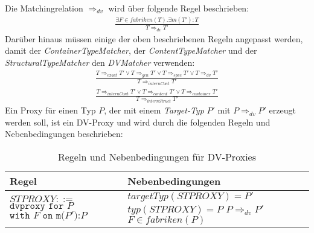 \documentclass[a4paper,12pt]{article}
\begin{document}
\noindent
Die Matchingrelation $\Rightarrow_{dv}$ wird über folgende Regel beschrieben:
\begin{gather*}
\frac{\exists F \in fabriken(T). \exists m(T'):T}{T \Rightarrow_{dv} T'}
\end{gather*}
Darüber hinaus müssen einige der oben beschriebenen Regeln angepasst werden, damit der \emph{ContainerTypeMatcher}, der \emph{ContentTypeMatcher} und der \emph{StructuralTypeMatcher} den \emph{DVMatcher} verwenden:
\begin{gather*}
\frac{T \Rightarrow_{exact} T' \vee T \Rightarrow_{gen} T' \vee
T \Rightarrow_{spec} T' \vee T \Rightarrow_{dv} T'  }{T \Rightarrow_{internCont} T'}
\end{gather*}
\begin{gather*}
\frac{T \Rightarrow_{internCont} T' \vee T \Rightarrow_{content} T' \vee
T \Rightarrow_{container} T'  }{T \Rightarrow_{internStruct} T'}
\end{gather*}
Ein Proxy für einen Typ $P$, der mit einem \emph{Target-Typ} $P'$ mit $P \Rightarrow_{dv} P'$ erzeugt werden soll, ist ein DV-Proxy und wird durch die folgenden Regeln und Nebenbedingungen beschrieben:
\begin{table}[H]
\centering
\begin{tabular}{|p{6cm}|p{8cm}|}
\hline
\centering\textbf{Regel} & \textbf{Nebenbedingungen} \\
\hline
\hline
$\mathit{STPROXY} ::=$\newline 
$\texttt{dvproxy }  \texttt{for } P$\newline
$\texttt{with } F \texttt{ on } \texttt{m(}\mathit{P'}\texttt{):}\mathit{P}$ 
& 
$\mathit{targetTyp(STPROXY) = P'}$\newline
$\mathit{typ(STPROXY) = P}$\newline
$\mathit{P} \Rightarrow_{dv} \mathit{P'}$\newline
$\mathit{F} \in \mathit{fabriken(P)}$\\
\hline
\hline
\end{tabular}
\caption{Regeln und Nebenbedingungen für DV-Proxies}
 \label{tab:dvAttr}
\end{table}
\end{document}
